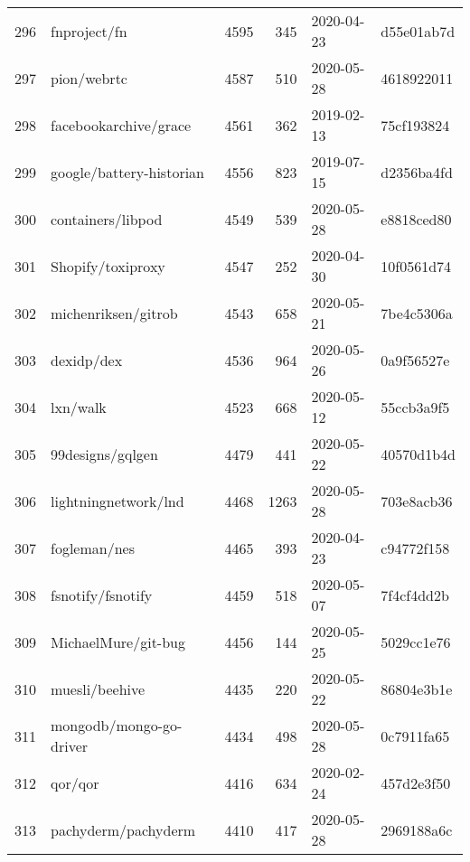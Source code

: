 \begin{longtable}{llrrll}
    296 &                                       fnproject/fn &   4595 &    345 & 2020-04-23 &  d55e01ab7d \\
    297 &                                        pion/webrtc &   4587 &    510 & 2020-05-28 &  4618922011 \\
    298 &                              facebookarchive/grace &   4561 &    362 & 2019-02-13 &  75cf193824 \\
    299 &                           google/battery-historian &   4556 &    823 & 2019-07-15 &  d2356ba4fd \\
    300 &                                  containers/libpod &   4549 &    539 & 2020-05-28 &  e8818ced80 \\
    301 &                                  Shopify/toxiproxy &   4547 &    252 & 2020-04-30 &  10f0561d74 \\
    302 &                                michenriksen/gitrob &   4543 &    658 & 2020-05-21 &  7be4c5306a \\
    303 &                                         dexidp/dex &   4536 &    964 & 2020-05-26 &  0a9f56527e \\
    304 &                                           lxn/walk &   4523 &    668 & 2020-05-12 &  55ccb3a9f5 \\
    305 &                                   99designs/gqlgen &   4479 &    441 & 2020-05-22 &  40570d1b4d \\
    306 &                               lightningnetwork/lnd &   4468 &   1263 & 2020-05-28 &  703e8acb36 \\
    307 &                                       fogleman/nes &   4465 &    393 & 2020-04-23 &  c94772f158 \\
    308 &                                  fsnotify/fsnotify &   4459 &    518 & 2020-05-07 &  7f4cf4dd2b \\
    309 &                                MichaelMure/git-bug &   4456 &    144 & 2020-05-25 &  5029cc1e76 \\
    310 &                                     muesli/beehive &   4435 &    220 & 2020-05-22 &  86804e3b1e \\
    311 &                            mongodb/mongo-go-driver &   4434 &    498 & 2020-05-28 &  0c7911fa65 \\
    312 &                                            qor/qor &   4416 &    634 & 2020-02-24 &  457d2e3f50 \\
    313 &                                pachyderm/pachyderm &   4410 &    417 & 2020-05-28 &  2969188a6c \\

\end{longtable}
